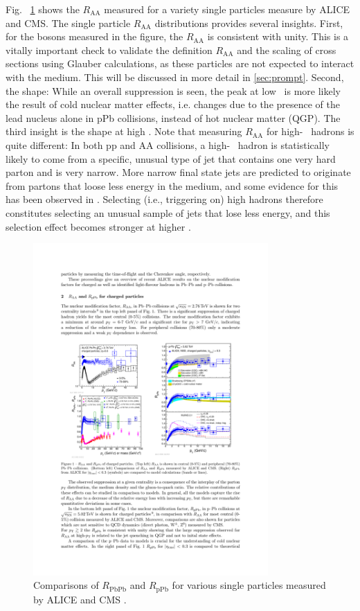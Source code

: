   Fig.~ \ref{fig:raa_particles} shows the $R_\mathrm{AA}$ measured for a variety single particles \cite{Bencedi2016} measure by ALICE and CMS. The single particle $R_\mathrm{AA}$ distributions provides several insights. First, for the bosons measured in the figure, the $R_\mathrm{AA}$ is consistent with unity. This is a vitally important check to validate the definition $R_\mathrm{AA}$ and the scaling of cross sections using Glauber calculations, as these particles are not expected to interact with the medium. This will be discussed in more detail in \ref{sec:prompt}. Second, the shape: While an overall suppression is seen, the peak at low \pt~is more likely the result of cold nuclear matter effects, i.e. changes due to the presence of the lead nucleus alone in pPb collisions, instead of hot nuclear matter (QGP). The third insight is the shape at high \pT. Note that measuring $R_\mathrm{AA}$ for high-\pT~ hadrons is quite different: In both pp and AA collisions, a high-\pT~ hadron is statistically likely to come from a specific, unusual type of jet that contains one very hard parton and is very narrow. More narrow final state jets are predicted to originate from partons that loose less energy in the medium, and some evidence for this has been observed in \cite{Khachatryan2016}. Selecting (i.e., triggering on) high \pt hadrons therefore constitutes selecting an unusual sample of jets that lose less energy, and this selection effect becomes stronger at higher \pT.

  \begin{figure}[htpb]
    \centering
    \includegraphics[width=0.8\textwidth]{Introduction/alice_hadron_raa.pdf}
    \caption{Comparisons of $R_\mathrm{PbPb}$ and $R_\mathrm{pPb}$ for various single particles measured by ALICE and CMS \cite{Bencedi2016}.}
    \label{fig:raa_particles}
  \end{figure}


